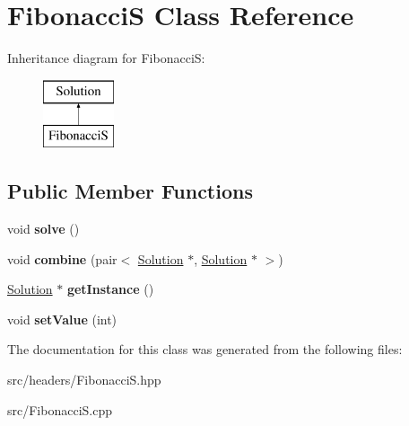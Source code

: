 \hypertarget{classFibonacciS}{\section{Fibonacci\-S Class Reference}
\label{classFibonacciS}
}
Inheritance diagram for Fibonacci\-S\-:\begin{figure}[H]
\begin{center}
\leavevmode
\includegraphics[height=2.000000cm]{classFibonacciS}
\end{center}
\end{figure}
\subsection*{Public Member Functions}
\begin{DoxyCompactItemize}
\item 
\hypertarget{classFibonacciS_ad4e73fb3cf507d46aab86777f2cabd9d}{void {\bfseries solve} ()}\label{classFibonacciS_ad4e73fb3cf507d46aab86777f2cabd9d}

\item 
\hypertarget{classFibonacciS_a7a3c9854b8396a160236bb15b903fecc}{void {\bfseries combine} (pair$<$ \hyperlink{classSolution}{Solution} $\ast$, \hyperlink{classSolution}{Solution} $\ast$ $>$)}\label{classFibonacciS_a7a3c9854b8396a160236bb15b903fecc}

\item 
\hypertarget{classFibonacciS_a59568b6a7ddbafa7e95f0d80979bf155}{\hyperlink{classSolution}{Solution} $\ast$ {\bfseries get\-Instance} ()}\label{classFibonacciS_a59568b6a7ddbafa7e95f0d80979bf155}

\item 
\hypertarget{classFibonacciS_a39170f654016c6f5d65e529f8441e0a4}{void {\bfseries set\-Value} (int)}\label{classFibonacciS_a39170f654016c6f5d65e529f8441e0a4}

\end{DoxyCompactItemize}


The documentation for this class was generated from the following files\-:\begin{DoxyCompactItemize}
\item 
src/headers/Fibonacci\-S.\-hpp\item 
src/Fibonacci\-S.\-cpp\end{DoxyCompactItemize}
